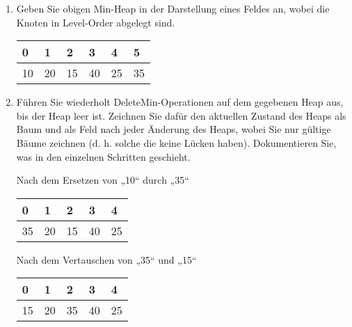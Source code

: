\documentclass{bschlangaul-aufgabe}
\begin{document}
\begin{enumerate}


\item Geben Sie obigen Min-Heap in der Darstellung eines Feldes an,
wobei die Knoten in Level-Order abgelegt sind.

\begin{bAntwort}
\begin{tabular}{llllll}
\bf{0} & \bf{1} & \bf{2} & \bf{3} & \bf{4} & \bf{5} \\
\hline
10     & 20     & 15     & 40     & 25     & 35     \\
\end{tabular}
\end{bAntwort}


\item Führen Sie wiederholt DeleteMin-Operationen auf dem gegebenen Heap
aus, bis der Heap leer ist. Zeichnen Sie dafür den aktuellen Zustand des
Heaps als Baum und als Feld nach jeder Änderung des Heaps, wobei Sie nur
gültige Bäume zeichnen (d. h. solche die keine Lücken haben).
Dokumentieren Sie, was in den einzelnen Schritten geschieht.

\begin{bAntwort}

%


\begin{bBaum}{Nach dem Ersetzen von „10“ durch „35“}
\begin{tabular}{lllll}
\bf{0} & \bf{1} & \bf{2} & \bf{3} & \bf{4} \\
\hline
35     & 20     & 15     & 40     & 25     \\
\end{tabular}

\end{bBaum}

\begin{bBaum}{Nach dem Vertauschen von „35“ und „15“}
\begin{tabular}{lllll}
\bf{0} & \bf{1} & \bf{2} & \bf{3} & \bf{4} \\
\hline
15     & 20     & 35     & 40     & 25     \\
\end{tabular}


\end{bBaum}
\end{bAntwort}
\end{enumerate}
\end{document}
